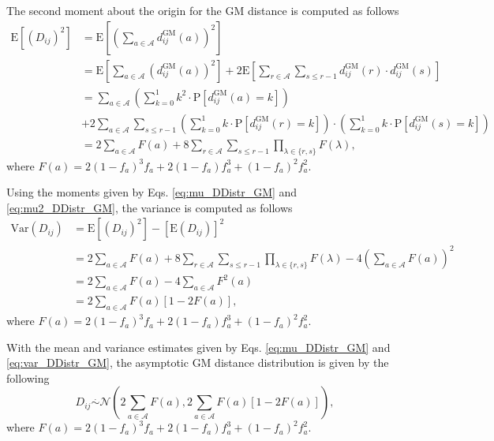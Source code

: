 \documentclass[10pt,letterpaper]{article}\usepackage[]{graphicx}\usepackage[]{color}
\begin{document}
The second moment about the origin for the GM distance is computed as follows
%
\begin{equation}\label{eq:mu2_DDistr_GM}
\begin{aligned}
\text{E}\left[\left(D_{ij}\right)^2\right] &= \text{E}\left[\left(\sum_{a \in \mathcal{A}} d^\text{GM}_{ij}(a)\right)^2\right] \\
&= \text{E}\left[\sum_{a \in \mathcal{A}} \left(d^\text{GM}_{ij}(a)\right)^2\right] + 2 \text{E}\left[\sum_{r \in \mathcal{A}} \sum_{s \leq r - 1} d^\text{GM}_{ij}(r) \cdot d^\text{GM}_{ij}(s)\right] \\
&= \sum_{a \in \mathcal{A}} \left(\sum_{k = 0}^{1} k^2 \cdot \text{P}\left[d^\text{GM}_{ij}(a) = k\right]\right) \\
&+ 2\sum_{a \in \mathcal{A}} \sum_{s \leq r - 1} \left(\sum_{k = 0}^{1} k \cdot \text{P}\left[d^\text{GM}_{ij}(r) = k\right]\right) \cdot \left(\sum_{k = 0}^{1} k \cdot \text{P}\left[d^\text{GM}_{ij}(s) = k\right]\right) \\
&= 2\sum_{a \in \mathcal{A}} F(a) + 8 \sum_{r \in \mathcal{A}} \sum_{s \leq r - 1} \prod_{\lambda \in \{r,s\}} F(\lambda),
\end{aligned}
\end{equation}
where $F(a) = 2(1 - f_a)^3f_a + 2(1 - f_a)f^3_a + (1 - f_a)^2f^2_a$.

Using the moments given by Eqs. \ref{eq:mu_DDistr_GM} and \ref{eq:mu2_DDistr_GM}, the variance is computed as follows
%
\begin{equation}\label{eq:var_DDistr_GM}
\begin{aligned}
\text{Var}(D_{ij}) &= \text{E}\left[(D_{ij})^2\right] - \left[\text{E}(D_{ij})\right]^2 \\
&= 2\sum_{a \in \mathcal{A}} F(a) + 8\sum_{r \in \mathcal{A}} \sum_{s \leq r - 1} \prod_{\lambda \in \{r,s\}} F(\lambda) - 4\left(\sum_{a \in \mathcal{A}}F(a)\right)^2 \\
&= 2\sum_{a \in \mathcal{A}} F(a) - 4\sum_{a \in \mathcal{A}}F^2(a) \\
&= 2\sum_{a \in \mathcal{A}} F(a)[1 - 2F(a)],
\end{aligned}
\end{equation}
where $F(a) = 2(1 - f_a)^3f_a + 2(1 - f_a)f^3_a + (1 - f_a)^2f^2_a$. 

With the mean and variance estimates given by Eqs. \ref{eq:mu_DDistr_GM} and \ref{eq:var_DDistr_GM}, the asymptotic GM distance distribution is given by the following
%
\begin{equation}\label{eq:DDistr_GM}
D_{ij} \overset{.}{\sim} \mathcal{N}\left(2\sum_{a \in \mathcal{A}} F(a), 2\sum_{a \in \mathcal{A}} F(a)[1 - 2F(a)]\right),
\end{equation}
where $F(a) = 2(1 - f_a)^3f_a + 2(1 - f_a)f^3_a + (1 - f_a)^2f^2_a$. 
\end{document}
